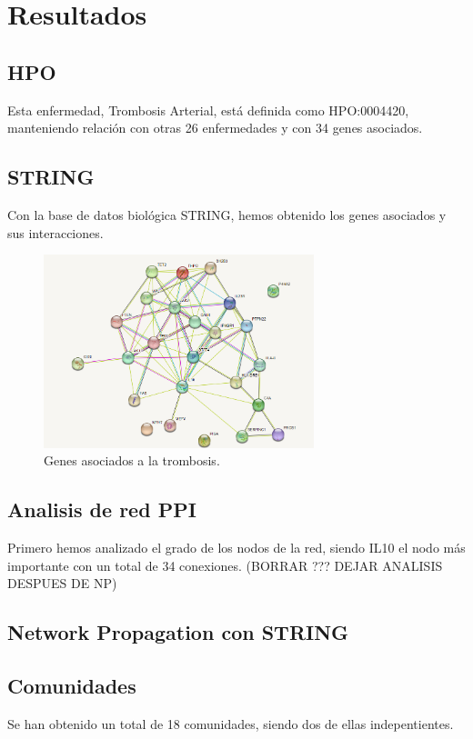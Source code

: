 \newpage
 \section{Resultados}
 
 \subsection{HPO}
 Esta enfermedad, Trombosis Arterial, está definida como HPO:0004420, manteniendo relación con otras 26 enfermedades y con 34 genes asociados.
 
 \subsection{STRING}
 Con la base de datos biológica STRING, hemos obtenido los genes asociados y sus interacciones.
\begin{figure}[h]
	\centering
	\includegraphics[width=0.70\textwidth]{figures/genes_asociados.png}
	\caption{Genes asociados a la trombosis.}
	\label{fig: Figura 3}
\end{figure}

\subsection{Analisis de red PPI} 
Primero hemos analizado el grado de los nodos de la red, siendo IL10 el nodo más importante con un total de 34 conexiones. (BORRAR ??? DEJAR ANALISIS DESPUES DE NP)

\subsection{Network Propagation con STRING}

\subsection{Comunidades}
Se han obtenido un total de 18 comunidades, siendo dos de ellas indepentientes.

